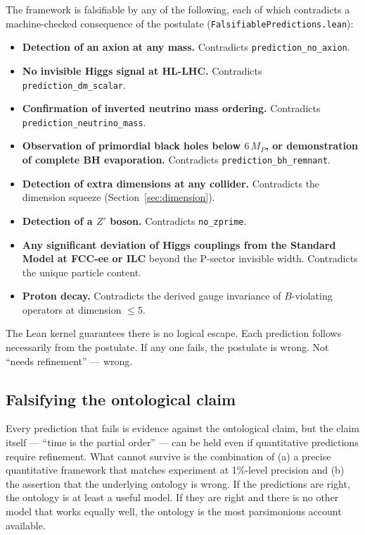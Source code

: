 \documentclass[11pt,letterpaper]{article}
\theoremstyle{remark}
\newcommand{\lean}[1]{\texttt{\small #1}}
\begin{document}
The framework is falsifiable by any of the following, each of which
contradicts a machine-checked consequence of the postulate
(\lean{FalsifiablePredictions.lean}):
\begin{itemize}[nosep]
  \item \textbf{Detection of an axion at any mass.} Contradicts
    \lean{prediction\_no\_axion}.
  \item \textbf{No invisible Higgs signal at HL-LHC.}
    Contradicts \lean{prediction\_dm\_scalar}.
  \item \textbf{Confirmation of inverted neutrino mass ordering.}
    Contradicts \lean{prediction\_neutrino\_mass}.
  \item \textbf{Observation of primordial black holes below $6\,M_P$,
    or demonstration of complete BH evaporation.}
    Contradicts \lean{prediction\_bh\_remnant}.
  \item \textbf{Detection of extra dimensions at any collider.}
    Contradicts the dimension squeeze (Section~\ref{sec:dimension}).
  \item \textbf{Detection of a $Z'$ boson.} Contradicts
    \lean{no\_zprime}.
  \item \textbf{Any significant deviation of Higgs couplings from
    the Standard Model at FCC-ee or ILC} beyond the P-sector
    invisible width. Contradicts the unique particle content.
  \item \textbf{Proton decay.} Contradicts the derived gauge
    invariance of $B$-violating operators at dimension $\leq 5$.
\end{itemize}

The Lean kernel guarantees there is no logical escape. Each
prediction follows necessarily from the postulate. If any one fails,
the postulate is wrong. Not ``needs refinement'' — wrong.

\subsection{Falsifying the ontological claim}

Every prediction that fails is evidence against the ontological
claim, but the claim itself — ``time is the partial order'' — can
be held even if quantitative predictions require refinement. What
cannot survive is the combination of (a) a precise quantitative
framework that matches experiment at 1\%-level precision and (b) the
assertion that the underlying ontology is wrong. If the predictions
are right, the ontology is at least a useful model. If they are
right and there is no other model that works equally well, the
ontology is the most parsimonious account available.
\end{document}
